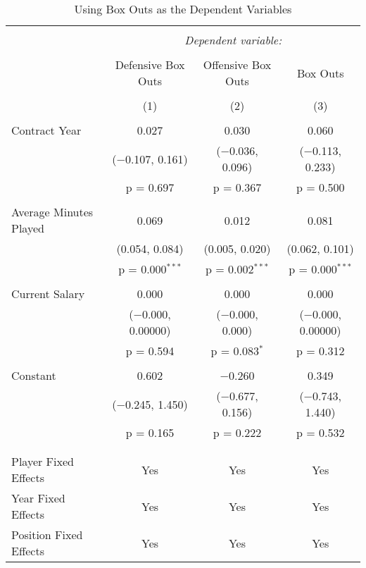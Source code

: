 \documentclass[12pt]{article}
\begin{document}
	\begin{sidewaystable}[!htbp] \centering 
		\caption{Using Box Outs as the Dependent Variables} 
		\label{regboxout} 
		\begin{tabular}{@{\extracolsep{5pt}}lccc} 
			\\[-1.8ex]\hline 
			\hline \\[-1.8ex] 
			& \multicolumn{3}{c}{\textit{Dependent variable:}} \\ 
			\cline{2-4} 
			\\[-1.8ex] & Defensive Box Outs & Offensive Box Outs & Box Outs \\ 
			\\[-1.8ex] & (1) & (2) & (3)\\ 
			\hline \\[-1.8ex] 
			Contract Year & 0.027 & 0.030 & 0.060 \\ 
			& ($-$0.107, 0.161) & ($-$0.036, 0.096) & ($-$0.113, 0.233) \\ 
			& p = 0.697 & p = 0.367 & p = 0.500 \\ 
			& & & \\ 
			Average Minutes Played & 0.069 & 0.012 & 0.081 \\ 
			& (0.054, 0.084) & (0.005, 0.020) & (0.062, 0.101) \\ 
			& p = 0.000$^{***}$ & p = 0.002$^{***}$ & p = 0.000$^{***}$ \\ 
			& & & \\ 
			Current Salary & 0.000 & 0.000 & 0.000 \\ 
			& ($-$0.000, 0.00000) & ($-$0.000, 0.000) & ($-$0.000, 0.00000) \\ 
			& p = 0.594 & p = 0.083$^{*}$ & p = 0.312 \\ 
			& & & \\ 
			Constant & 0.602 & $-$0.260 & 0.349 \\ 
			& ($-$0.245, 1.450) & ($-$0.677, 0.156) & ($-$0.743, 1.440) \\ 
			& p = 0.165 & p = 0.222 & p = 0.532 \\ 
			& & & \\ 
			\hline \\[-1.8ex] 
			Player Fixed Effects & Yes & Yes & Yes \\ 
			Year Fixed Effects & Yes & Yes & Yes \\ 
			Position Fixed Effects & Yes & Yes & Yes \\ 

\end{tabular}
\end{sidewaystable}
\end{document}
